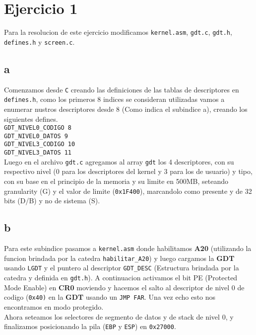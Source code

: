 \section{Ejercicio 1}

Para la resolucion de este ejercicio modificamos \texttt{kernel.asm}, \texttt{gdt.c}, \texttt{gdt.h}, \texttt{defines.h} y \texttt{screen.c}.

\subsection{a}
Comenzamos desde \texttt{C} creando las definiciones de las tablas de descriptores en \texttt{defines.h}, como los primeros 8 indices se consideran utilizadas vamos a enumerar nustros descriptores desde 8 (Como indica el subindice a), creando los siguientes defines. \\
\texttt{GDT\_NIVEL0\_CODIGO   8} \\
\texttt{GDT\_NIVEL0\_DATOS    9} \\
\texttt{GDT\_NIVEL3\_CODIGO   10} \\
\texttt{GDT\_NIVEL3\_DATOS    11} \\

Luego en el archivo \texttt{gdt.c} agregamos al array \texttt{gdt} los 4 descriptores, con su respectivo nivel (0 para los descriptores del kernel y 3 para los de usuario) y tipo, con su base en el principio de la memoria y su limite en 500MB, seteando granularity (G) y el valor de limite (\texttt{0x1F400}), marcandolo como presente y de 32 bits (D/B) y no de sistema (S).

\subsection{b}
Para este subindice pasamos a \texttt{kernel.asm} donde habilitamos \textbf{A20} (utilizando la funcion brindada por la catedra \texttt{habilitar\_A20}) y luego cargamos la \textbf{GDT} usando \texttt{LGDT} y el puntero al descriptor \texttt{GDT\_DESC} (Estructura brindada por la catedra y definida en \texttt{gdt.h}). A continuacion activamos el bit PE (Protected Mode Enable) en \textbf{CR0} moviendo y hacemos el salto al descriptor de nivel 0 de codigo (\texttt{0x40)} en la \textbf{GDT} usando un \texttt{JMP FAR}. Una vez echo esto nos encontramos en modo protegido. \\

Ahora seteamos los selectores de segmento de datos y de stack de nivel 0, y finalizamos posicionando la pila (\texttt{EBP} y \texttt{ESP}) en \texttt{0x27000}.

